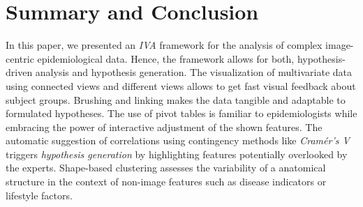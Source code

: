 \documentclass[journal]{style/vgtc} 			          %
\begin{document}
\section{Summary and Conclusion}
In this paper, we presented an \emph{IVA} framework for the analysis of complex image-centric epidemiological data.
%
Hence, the framework allows for both, hypothesis-driven analysis and hypothesis generation.
%
%
The visualization of multivariate data using connected views and different views allows to get fast visual feedback about subject groups.
%
Brushing and linking makes the data tangible and adaptable to formulated hypotheses.
%
The use of pivot tables is familiar to epidemiologists while embracing the power of interactive adjustment of the shown features.
%
The automatic suggestion of correlations using contingency methods like \emph{Cram\'{e}r's V} triggers \emph{hypothesis generation} by highlighting features potentially overlooked by the experts.
%
Shape-based clustering assesses the variability of a anatomical structure in the context of non-image features such as disease indicators or lifestyle factors.
%
\end{document}
